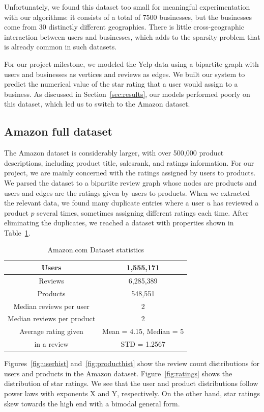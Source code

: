 \documentclass[letterpaper, 11 pt, conference]{ieeeconf}
\begin{document}
Unfortunately, we found this dataset too small for meaningful experimentation 
with our algorithms: it consists of a total of 7500 businesses, but the 
businesses come from 30 distinctly different geographies. There is little
cross-geographic interaction between users and businesses, which adds to the 
sparsity problem that is already common in such datasets. 

For our project milestone, we modeled the Yelp data using a bipartite graph 
with users and businesses as vertices and reviews as edges.
We built our system to predict the numerical value of the star
rating that a user would assign to a business. As discussed in 
Section~\ref{sec:results}, our models performed poorly on this dataset, which 
led us to switch to the Amazon dataset.

\subsection{Amazon full dataset}
The Amazon dataset is considerably larger, with over 
500,000 product descriptions, including product title, salesrank, and ratings 
information. For our project, we are mainly concerned with the ratings assigned 
by users to products. We parsed the dataset to a bipartite review 
graph whose nodes are products and users and edges are the ratings given by 
users to products. When we extracted the relevant data, we found many 
duplicate entries where a user $u$ has reviewed a product $p$ several times, 
sometimes assigning different ratings each time. After eliminating the 
duplicates, we reached a dataset with properties shown in 
Table~\ref{table:amazonstats}.

\begin{table}[htb]
\centering
\begin{tabular}{|c|c|}
\hline
Users &1,555,171 \tabularnewline \hline
Reviews &6,285,389 \tabularnewline \hline
Products &548,551 \tabularnewline \hline
Median reviews per user & 2
\tabularnewline \hline
Median reviews per product & 2
\tabularnewline \hline
Average rating given &Mean = 4.15, Median = 5 \tabularnewline
in a review &STD = 1.2567
\tabularnewline \hline

\end{tabular}
\caption{ Amazon.com Dataset statistics }
\label{table:amazonstats}
\end{table}

Figures~\ref{fig:userhist} and~\ref{fig:producthist} show the review count 
distributions for users and products in the Amazon dataset. 
Figure~\ref{fig:ratings} shows the distribution of star ratings. We see that 
the user and product distributions follow power laws with exponents X and Y, 
respectively. On the other hand, star ratings skew towards the high end with 
a bimodal general form.
\end{document}
